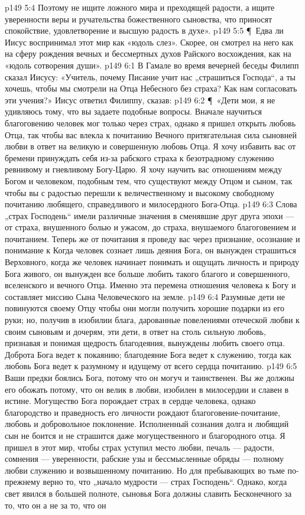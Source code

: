 \vs p149 5:4 Поэтому не ищите ложного мира и преходящей радости, а ищите уверенности веры и ручательства божественного сыновства, что приносят спокойствие, удовлетворение и высшую радость в духе».
\vs p149 5:5 \P\ Едва ли Иисус воспринимал этот мир как «юдоль слез». Скорее, он смотрел на него как на сферу рождения вечных и бессмертных духов Райского восхождения, как на «юдоль сотворения души».
\vs p149 6:1 В Гамале во время вечерней беседы Филипп сказал Иисусу: «Учитель, почему Писание учит нас „страшиться Господа“, а ты хочешь, чтобы мы смотрели на Отца Небесного без страха? Как нам согласовать эти учения?» Иисус ответил Филиппу, сказав:
\vs p149 6:2 \P\ «Дети мои, я не удивляюсь тому, что вы задаете подобные вопросы. Вначале научиться благоговению человек мог только через страх, однако я пришел открыть любовь Отца, так чтобы вас влекла к почитанию Вечного притягательная сила сыновней любви в ответ на великую и совершенную любовь Отца. Я хочу избавить вас от бремени принуждать себя из\hyp{}за рабского страха к безотрадному служению ревнивому и гневливому Богу\hyp{}Царю. Я хочу научить вас отношениям между Богом и человеком, подобным тем, что существуют между Отцом и сыном, так чтобы вы с радостью перешли к величественному и высокому свободному почитанию любящего, справедливого и милосердного Бога\hyp{}Отца.
\vs p149 6:3 Слова „страх Господень“ имели различные значения в сменявшие друг друга эпохи --- от страха, внушенного болью и ужасом, до страха, внушаемого благоговением и почитанием. Теперь же от почитания я проведу вас через признание, осознание и понимание к  Когда человек сознает лишь деяния Бога, он вынужден страшиться Верховного, когда же человек начинает понимать и ощущать личность и природу Бога живого, он вынужден все больше любить такого благого и совершенного, вселенского и вечного Отца. Именно эта перемена отношения человека к Богу и составляет миссию Сына Человеческого на земле.
\vs p149 6:4 Разумные дети не повинуются своему Отцу чтобы они могли получить хорошие подарки из его руки; но, получив в изобилии блага, дарованные повелениями отеческой любви к своим сыновьям и дочерям, эти дети, в ответ на столь сильную любовь, признавая и понимая щедрость благодеяния, вынуждены любить своего отца. Доброта Бога ведет к покаянию; благодеяние Бога ведет к служению, тогда как любовь Бога ведет к разумному и идущему от всего сердца почитанию.
\vs p149 6:5 Ваши предки боялись Бога, потому что он могуч и таинственен. Вы же должны его обожать потому, что он велик в любви, изобилен в милосердии и славен в истине. Могущество Бога порождает страх в сердце человека, однако благородство и праведность его личности рождают благоговение\hyp{}почитание, любовь и добровольное поклонение. Исполненный сознания долга и любящий сын не боится и не страшится даже могущественного и благородного отца. Я пришел в этот мир, чтобы страх уступил место любви, печаль --- радости, сомнения --- уверенности, рабские узы и бессмысленные обряды --- полному любви служению и возвышенному почитанию. Но для пребывающих во тьме по\hyp{}прежнему верно то, что „начало мудрости --- страх Господень“. Однако, когда свет явился в большей полноте, сыновья Бога должны славить Бесконечного за то, что он  а не за то, что он 
